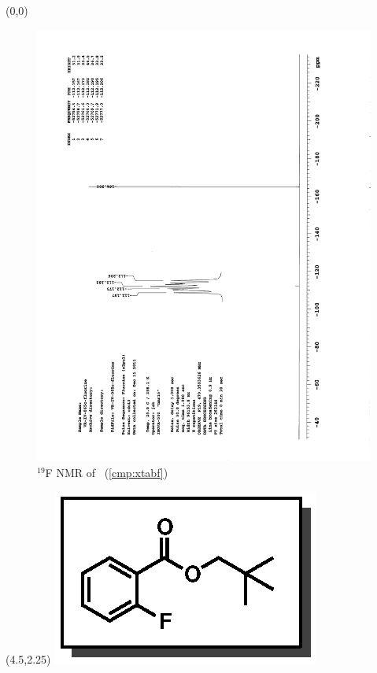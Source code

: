 \clearpage
\begin{textblock}{20}(0,0)
\begin{figure}[htb]
\caption{$^{19}$F NMR of  \CMPxtabf\ (\ref{cmp:xtabf})}
\includegraphics[scale=0.75, trim = 0mm 0mm 0mm 5mm,
clip]{chp_asymmetric/images/nmr/xtabfF}
\vspace{-100pt}
\end{figure}
\end{textblock}
\begin{textblock}{1}(4.5,2.25)
\includegraphics[scale=0.8, angle=90]{chp_asymmetric/images/xtabf}
\end{textblock}
\clearpage

